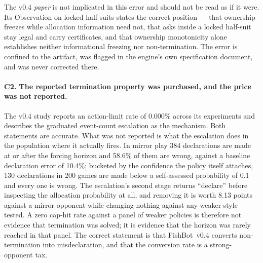 \documentclass[11pt]{article}
\theoremstyle{definition}
\DeclareRobustCommand{\vfour}{\texorpdfstring{\mbox{FishBot v0.4}}{FishBot v0.4}}
\providecommand{\numDeclWrong}{10.4}
\providecommand{\numPostHorizonDecl}{384}
\providecommand{\numPostHorizonWrong}{58.6}
\providecommand{\numStageTwoCost}{8.13}
\providecommand{\numLowConfDecl}{130}
\providecommand{\numLowConfGames}{200}
\providecommand{\numLowConfThresh}{0.1}
\providecommand{\numVfourLimitRate}{0.000\%}
\begin{document}
The v0.4 \emph{paper} is not implicated in this error and should not be read as
if it were. Its Observation on locked half-suits states the correct position ---
that ownership freezes while allocation information need not, that asks inside a
locked half-suit stay legal and carry certificates, and that ownership
monotonicity alone establishes neither informational freezing nor
non-termination. The error is confined to the artifact, was flagged in the
engine's own specification document, and was never corrected there.

\paragraph{C2. The reported termination property was purchased, and the price was
not reported.} The v0.4 study reports an action-limit rate of \numVfourLimitRate{}
across its experiments and describes the graduated event-count escalation as the
mechanism. Both statements are accurate. What was not reported is what the
escalation does in the population where it actually fires. In mirror play
\numPostHorizonDecl{} declarations are made at or after the forcing horizon and
\numPostHorizonWrong\% of them are wrong, against a baseline declaration error of
\numDeclWrong\%; bucketed by the confidence the policy itself attaches,
\numLowConfDecl{} declarations in \numLowConfGames{} games are made below a
self-assessed probability of \numLowConfThresh{} and every one is wrong. The escalation's second stage returns ``declare'' before
inspecting the allocation probability at all, and removing it is worth
\numStageTwoCost{} points against a mirror opponent while changing nothing
against any weaker style tested. A zero cap-hit rate against a panel of weaker
policies is therefore not evidence that termination was solved; it is evidence
that the horizon was rarely reached in that panel. The correct statement is that
\vfour{} converts non-termination into misdeclaration, and that the conversion
rate is a strong-opponent tax.
\end{document}
